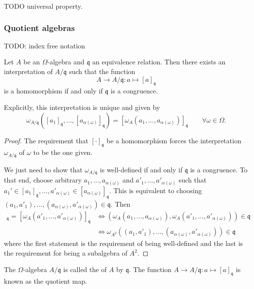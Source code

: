TODO universal property.

\subsubsection{Quotient algebras}
TODO: index free notation

\begin{proposition} \label{quotientAlgebra}
Let $A$ be an $\Omega$-algebra and $\mathfrak{q}$ an equivalence relation. Then there exists an interpretation of $A/\mathfrak{q}$ such that the function
\[ A \to A/\mathfrak{q}: a\mapsto [a]_\mathfrak{q} \]
is a homomorphism if and only if $\mathfrak{q}$ is a congruence.

Explicitly, this interpretation is unique and given by
\[ \omega_{A/\mathfrak{q}}([a_1]_{\mathfrak{q}},\ldots,[a_{\alpha(\omega)}]_{\mathfrak{q}}) = [\omega_A(a_1,\ldots, a_{\alpha(\omega)})]_{\mathfrak{q}} \qquad \forall \omega\in\Omega. \]\end{proposition}
\begin{proof}
The requirement that $[\cdot]_\mathfrak{q}$ be a homomorphism forces the interpretation $\omega_{A/\mathfrak{q}}$ of $\omega$ to be the one given.

We just need to show that $\omega_{A/\mathfrak{q}}$ is well-defined if and only if $\mathfrak{q}$ is a congruence. To that end, choose arbitrary $a_1, \ldots, a_{\alpha(\omega)}$ and $a'_1, \ldots, a'_{\alpha(\omega)}$ such that $a_1'\in[a_1]_\mathfrak{q}, \ldots, a'_{\alpha(\omega)}\in [a_{\alpha(\omega)}]_\mathfrak{q}$. This is equivalent to choosing $(a_1,a'_1),\ldots, (a_{\alpha(\omega)},a'_{\alpha(\omega)}) \in \mathfrak{q}$. Then
\begin{align*}
[\omega_A(a_1,\ldots, a_{\alpha(\omega)})]_{\mathfrak{q}} = [\omega_A(a'_1,\ldots, a'_{\alpha(\omega)})]_{\mathfrak{q}} &\iff (\omega_A(a_1,\ldots, a_{\alpha(\omega)}),\omega_A(a'_1,\ldots, a'_{\alpha(\omega)})) \in \mathfrak{q} \\
&\iff \omega_{A^2}((a_1,a'_1),\ldots, (a_{\alpha(\omega)},a'_{\alpha(\omega)})) \in \mathfrak{q}
\end{align*}
where the first statement is the requirement of being well-defined and the last is the requirement for being a subalgebra of $A^2$.
\end{proof}
\begin{definition}
The $\Omega$-algebra $A/\mathfrak{q}$ is called the  of $A$ by $\mathfrak{q}$. The function $A \to A/\mathfrak{q}: a\mapsto [a]_\mathfrak{q}$ is known as the quotient map.
\end{definition}

